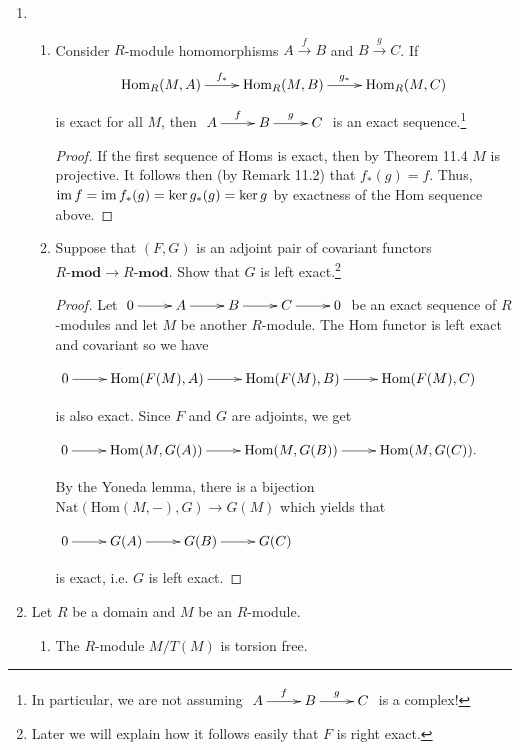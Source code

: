 \documentclass[11pt,oneside,english]{amsart}
\theoremstyle{definition}
\newcommand{\im}{\text{im\,}}
\newcommand{\Hom}{\text{Hom}}
\begin{document}
\begin{enumerate}[leftmargin=*]
\pagebreak

\item \begin{enumerate}
\item Consider $R$-module homomorphisms $A \xrightarrow{f} B $ and $B \xrightarrow{g} C$. If
$$\xymatrix{\Hom_R(M,A) \ar[r]^{f_*} & \Hom_R(M,B) \ar[r]^-{g_*} & \Hom_R(M,C)}$$
is exact for all $M$, then $\xymatrix{A \ar[r]^-f & B \ar[r]^-g & C}$ is an exact sequence.\footnote{In particular, we are not assuming $\xymatrix{A \ar[r]^-f & B \ar[r]^-g & C}$ is a complex!}

\begin{proof}
If the first sequence of Homs is exact, then by Theorem 11.4 $M$ is projective. It follows then (by Remark 11.2) that $f_*(g)=f$. Thus, $\im f = \im f_*(g)=\ker g_*(g)=\ker g$ by exactness of the Hom sequence above.
\end{proof}

\item Suppose that $(F,G)$ is an adjoint pair of covariant functors $R\textbf{-mod} \longrightarrow R\textbf{-mod}$. Show that $G$ is left exact.\footnote{Later we will explain how it follows easily that $F$ is right exact.}

\begin{proof}
Let $\xymatrix{0 \ar[r] & A \ar[r] & B \ar[r] & C \ar[r] &0}$ be an exact sequence of $R$-modules and let $M$ be another $R$-module. The Hom functor is left exact and covariant so we have
\begin{center}
$\xymatrix{0 \ar[r] & \text{Hom}(F(M),A) \ar[r] & \text{Hom}(F(M),B) \ar[r] & \text{Hom}(F(M),C)}$
\end{center}
is also exact. Since $F$ and $G$ are adjoints, we get
\begin{center}
$\xymatrix{0 \ar[r] & \text{Hom}(M,G(A)) \ar[r] & \text{Hom}(M,G(B)) \ar[r] & \text{Hom}(M,G(C)).}$
\end{center}
By the Yoneda lemma, there is a bijection $\text{Nat}(\text{Hom}(M,-),G)\to G(M)$ which yields that 
\begin{center}
$\xymatrix{0 \ar[r] & G(A) \ar[r] & G(B) \ar[r] & G(C)}$
\end{center}
is exact, i.e. $G$ is left exact.
\end{proof}
\end{enumerate}

\pagebreak
\noindent
{} 
\item Let $R$ be a domain and $M$ be an $R$-module.
\begin{enumerate}
\item The $R$-module $M/T(M)$ is torsion free.


\end{enumerate}
\end{enumerate}
\end{document}
